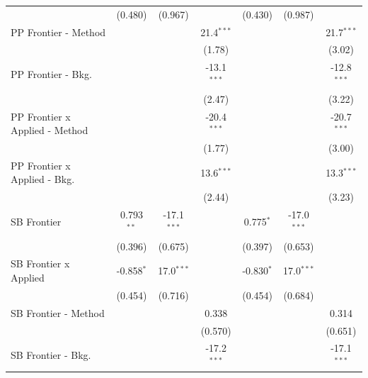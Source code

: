 \begin{tabular}{lcccccc}
                                  & (0.480)       & (0.967)       &               & (0.430)       & (0.987)       &   \\   
   PP Frontier - Method           &               &               & 21.4$^{***}$  &               &               & 21.7$^{***}$\\   
                                  &               &               & (1.78)        &               &               & (3.02)\\   
   PP Frontier - Bkg.             &               &               & -13.1$^{***}$ &               &               & -12.8$^{***}$\\   
                                  &               &               & (2.47)        &               &               & (3.22)\\   
   PP Frontier x Applied - Method &               &               & -20.4$^{***}$ &               &               & -20.7$^{***}$\\   
                                  &               &               & (1.77)        &               &               & (3.00)\\   
   PP Frontier x Applied - Bkg.   &               &               & 13.6$^{***}$  &               &               & 13.3$^{***}$\\   
                                  &               &               & (2.44)        &               &               & (3.23)\\   
   SB Frontier                    & 0.793$^{**}$  & -17.1$^{***}$ &               & 0.775$^{*}$   & -17.0$^{***}$ &   \\   
                                  & (0.396)       & (0.675)       &               & (0.397)       & (0.653)       &   \\   
   SB Frontier x Applied          & -0.858$^{*}$  & 17.0$^{***}$  &               & -0.830$^{*}$  & 17.0$^{***}$  &   \\   
                                  & (0.454)       & (0.716)       &               & (0.454)       & (0.684)       &   \\   
   SB Frontier - Method           &               &               & 0.338         &               &               & 0.314\\   
                                  &               &               & (0.570)       &               &               & (0.651)\\   
   SB Frontier - Bkg.             &               &               & -17.2$^{***}$ &               &               & -17.1$^{***}$\\   

\end{tabular}
